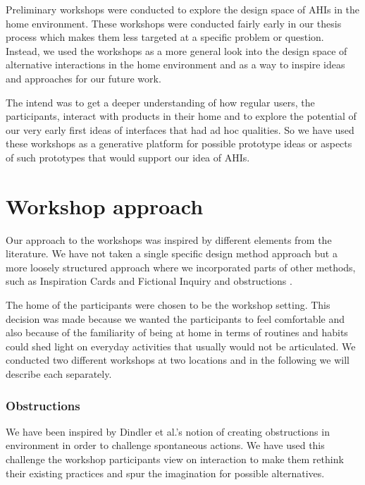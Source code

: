 
Preliminary workshops were conducted to explore the design space of AHIs in the home environment.
These workshops were conducted fairly early in our thesis process which makes them less targeted at a specific problem or question.
Instead, we used the workshops as a more general look into the design space of alternative interactions in the home environment and as a way to inspire ideas and approaches for our future work.

The intend was to get a deeper understanding of how regular users, the participants, interact with products in their home and to explore the potential of our very early first ideas of interfaces that had ad hoc qualities.
So we have used these workshops as a generative platform for possible prototype ideas or aspects of such prototypes that would support our idea of AHIs.

\section{Workshop approach}
\label{ch:workshops:approach}
Our approach to the workshops was inspired by different elements from the literature.
We have not taken a single specific design method approach but a more loosely structured approach where we incorporated parts of other methods, such as Inspiration Cards \citep{halskov2006inspiration} and Fictional Inquiry and obstructions \citep{dindler2007fictional}.

The home of the participants were chosen to be the workshop setting.
This decision was made because we wanted the participants to feel comfortable and also because of the familiarity of being at home in terms of routines and habits could shed light on everyday activities that usually would not be articulated.
We conducted two different workshops at two locations and in the following we will describe each separately.

\subsubsection{Obstructions}
\label{ch:workshops:approach:obstructions}

We have been inspired by Dindler et al.'s \citep{dindler2007fictional} notion of creating obstructions in environment in order to challenge spontaneous actions.
We have used this challenge the workshop participants view on interaction to make them rethink their existing practices and spur the imagination for possible alternatives. 

